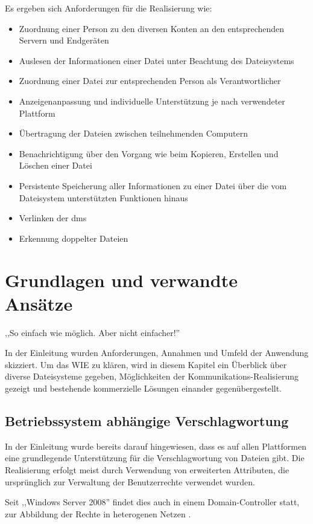 \documentclass[oneside, ngerman, toc=bibliography,bibliography=totoc,listof=entryprefix, open=right,numbers=noenddot,fontsize=12pt]{scrbook}
\newcommand\chapmd[2]{\begin{mdframed}[%
		rightline=false,leftline=false,topline=false,bottomline=false,frametitlerule=false,
		userdefinedwidth=\textwidth,frametitlealignment=\flushright, %
		frametitlerulecolor=black,frametitle={\small #1}]
		\flushright{} \footnotesize{} #2
	\end{mdframed}}
\begin{document}
\bigskip
Es ergeben sich Anforderungen für die Realisierung wie:
\begin{itemize}
\item Zuordnung einer Person zu den diversen Konten an den entsprechenden Servern und Endgeräten
\item Auslesen der Informationen einer Datei unter Beachtung des Dateisystems
\item Zuordnung einer Datei zur entsprechenden Person als Verantwortlicher
\item Anzeigenanpassung und individuelle Unterstützung je nach verwendeter Plattform
\item Übertragung der Dateien zwischen teilnehmenden Computern
\item Benachrichtigung über den Vorgang wie beim Kopieren, Erstellen und Löschen einer Datei
\item Persistente Speicherung aller Informationen zu einer Datei über die vom Dateisystem unterstützten Funktionen hinaus
\item Verlinken der \acrshort{dms}
\item Erkennung doppelter Dateien
\end{itemize}
 


\chapter{Grundlagen und verwandte Ansätze}
\chapmd{Albert Einstein (1879--1955)}{,,So einfach wie möglich. Aber nicht einfacher!''}

In der Einleitung wurden Anforderungen, Annahmen und Umfeld der Anwendung skizziert.
Um das WIE zu klären, wird in diesem Kapitel ein Überblick über diverse Dateisysteme gegeben, Möglichkeiten der Kommunikations-Realisierung gezeigt und bestehende kommerzielle Lösungen einander gegenübergestellt.

\section{Betriebssystem abhängige Verschlagwortung}
In der Einleitung wurde bereits darauf hingewiesen, dass es auf allen Plattformen eine grundlegende Unterstützung für die Verschlagwortung von Dateien gibt. Die Realisierung erfolgt meist durch Verwendung von erweiterten Attributen, die ursprünglich zur Verwaltung der Benutzerrechte verwendet wurden. 

Seit ,,Windows Server 2008'' findet dies auch in einem Domain-Controller statt, zur Abbildung der Rechte in heterogenen Netzen \cite{windowsserver2008}.
\end{document}
